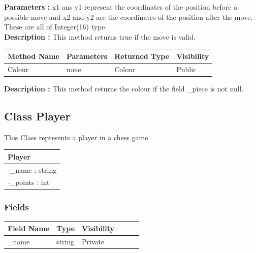 \documentclass[12pt]{article}
\begin{document}
\textbf{Parameters :} x1 ans y1 represent the coordinates of the position before a possible move
and x2 and y2 are the coordinates of the position after the move. These are all of Integer(16) type.
\\

\textbf{Description :} This method returns true if the move is valid.

\begin{table}[H]
    \begin{tabular}{|l|l|l|l|}
    \hline
    \rowcolor[HTML]{EFEFEF} 
    \cellcolor[HTML]{EFEFEF}\textbf{Method Name} & \textbf{Parameters}     & \textbf{Returned Type} & \textbf{Visibility} \\ \hline
    Colour                                       & none                    & Colour                   & Public              \\ \hline
    \end{tabular}
\end{table}

\textbf{Description :} This method returns the colour if the field \_piece is not null.

\newpage


\subsection{Class Player}

This Class represents a player in a chess game.

\begin{table}[H]
    \begin{tabular}{|l|}
    \hline
    \rowcolor[HTML]{C0C0C0} 
    \textbf{Player}          \\ \hline
    \rowcolor[HTML]{EFEFEF}
    -\_name : string        \\ \hline
    -\_points : int         \\ \hline
    \end{tabular}
\end{table}

\subsubsection{Fields}

\begin{table}[H]
    \begin{tabular}{llllll}
    \hline
    \multicolumn{1}{|l|}{\cellcolor[HTML]{EFEFEF}\textbf{Field Name}} & \multicolumn{1}{l|}{\cellcolor[HTML]{EFEFEF}\textbf{Type}} & \multicolumn{1}{l|}{\cellcolor[HTML]{EFEFEF}\textbf{Visibility}} \\ \hline
    \multicolumn{1}{|l|}{\_name}                                      & \multicolumn{1}{l|}{string}                                & \multicolumn{1}{l|}{Private}                                     \\ \hline
    \end{tabular}
\end{table}
\end{document}
